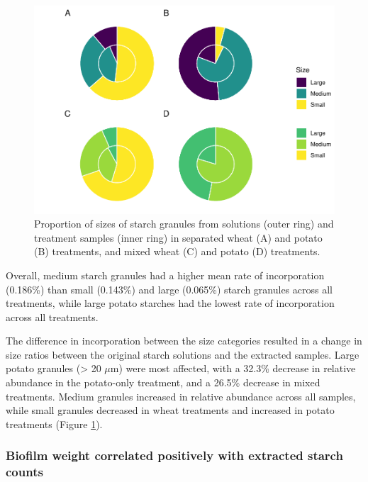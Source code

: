 \documentclass[
]{article}
\begin{document}
\begin{figure}
\centering
\includegraphics{../figures/ratio-plots-1.pdf}
\caption{\label{fig:ratio-plots}Proportion of sizes of starch granules from solutions (outer ring) and treatment samples (inner ring) in separated wheat (A) and potato (B) treatments, and mixed wheat (C) and potato (D) treatments.}
\end{figure}

Overall, medium starch granules had a higher mean rate of incorporation
(0.186\%)
than small
(0.143\%)
and large
(0.065\%)
starch granules across all treatments, while large potato starches had the lowest
rate of incorporation across all treatments.

The difference in incorporation between the size categories resulted in a change
in size ratios between the original starch solutions and the extracted samples.
Large potato granules (\textgreater{} 20 \(\mu\)m) were most affected, with a
32.3\%
decrease in relative abundance in the potato-only treatment, and a
26.5\%
decrease in mixed treatments. Medium granules increased in relative abundance
across all samples, while small granules decreased in wheat treatments and
increased in potato treatments
(Figure \ref{fig:ratio-plots}).

\hypertarget{biofilm-weight-correlated-positively-with-extracted-starch-counts}{%
\subsubsection{Biofilm weight correlated positively with extracted starch counts}\label{biofilm-weight-correlated-positively-with-extracted-starch-counts}}
\end{document}

